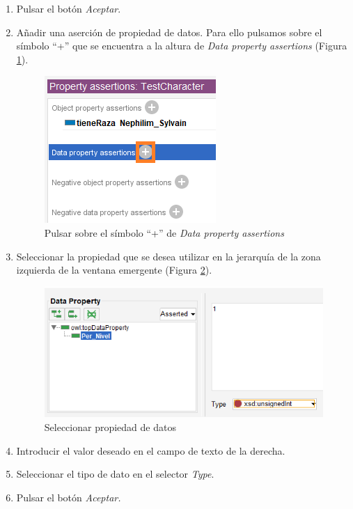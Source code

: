 \begin{enumerate}
    \item Pulsar el botón \textit{Aceptar}.

    \item Añadir una aserción de propiedad de datos. Para ello pulsamos sobre el símbolo “+” que se encuentra a la altura de 
    \textit{Data property assertions} (Figura \ref*{AddProperties_4}).
    \begin{figure}[ht]
        \centering
        \includegraphics[scale=0.6]{Figures/Protege/AddProperties_4.png}
        \caption{Pulsar sobre el símbolo “+” de \textit{Data property assertions}}
        \label{AddProperties_4}
    \end{figure}

    \item Seleccionar la propiedad que se desea utilizar en la jerarquía de la zona izquierda de la ventana emergente 
    (Figura \ref*{AddProperties_5}).\newpage
    \begin{figure}[ht]
        \centering
        \includegraphics[scale=0.6]{Figures/Protege/AddProperties_5.png}
        \caption{Seleccionar propiedad de datos}
        \label{AddProperties_5}
    \end{figure}

    \item Introducir el valor deseado en el campo de texto de la derecha.
    \item Seleccionar el tipo de dato en el selector \textit{Type}.
    \item Pulsar el botón \textit{Aceptar.}

\end{enumerate}

